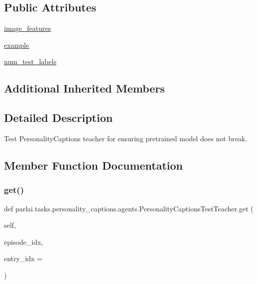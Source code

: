 \subsection*{Public Attributes}
\begin{DoxyCompactItemize}
\item 
\hyperlink{classparlai_1_1tasks_1_1personality__captions_1_1agents_1_1PersonalityCaptionsTestTeacher_a3b99c22797205aaf11f652bd28c314c3}{image\+\_\+features}
\item 
\hyperlink{classparlai_1_1tasks_1_1personality__captions_1_1agents_1_1PersonalityCaptionsTestTeacher_a183b3779c4ce45111f608a263e8147a5}{example}
\item 
\hyperlink{classparlai_1_1tasks_1_1personality__captions_1_1agents_1_1PersonalityCaptionsTestTeacher_aa2232ceb48d0dd2f67e8f15ac0a549e0}{num\+\_\+test\+\_\+labels}
\end{DoxyCompactItemize}
\subsection*{Additional Inherited Members}


\subsection{Detailed Description}
\begin{DoxyVerb}Test PersonalityCaptions teacher for ensuring pretrained model does not break.
\end{DoxyVerb}
 

\subsection{Member Function Documentation}
\mbox{\label{classparlai_1_1tasks_1_1personality__captions_1_1agents_1_1PersonalityCaptionsTestTeacher_a07f538c8c1ff16a9d08b78d1ea3ef1f8}} 
\subsubsection{\texorpdfstring{get()}{get()}}
{\footnotesize\ttfamily def parlai.\+tasks.\+personality\+\_\+captions.\+agents.\+Personality\+Captions\+Test\+Teacher.\+get (\begin{DoxyParamCaption}\item[{}]{self,  }\item[{}]{episode\+\_\+idx,  }\item[{}]{entry\+\_\+idx = {} }\end{DoxyParamCaption})}

